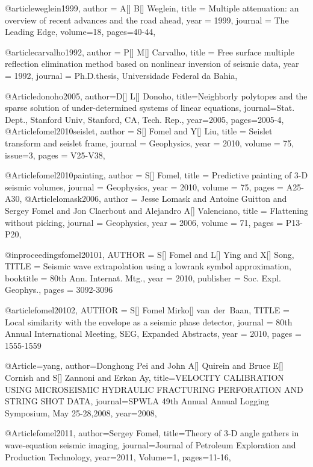 @article{weglein1999,
  author =	 {A[] B[] Weglein},
  title =	 {Multiple attenuation: an overview of recent advances and the road ahead},
  year =	 1999,
  journal =	 {The Leading Edge},
  volume=18,
 pages=40-44,
}

@article{carvalho1992,
  author =	 {P[] M[] Carvalho},
  title =	 {Free surface multiple reflection elimination method based on nonlinear inversion of seismic data},
  year =	 1992,
  journal =	 {Ph.D.thesis, Universidade Federal da Bahia},
}

@Article{donoho2005,
  author={D[] L[] Donoho},
  title={Neighborly polytopes and the sparse solution of under-determined systems of linear equations},
  journal={Stat. Dept., Stanford Univ, Stanford, CA, Tech. Rep.},
  year=2005,
  pages={2005-4},
}
@Article{fomel2010seislet,
  author = 	 {S[] Fomel and Y[] Liu},
  title = 	 {Seislet transform and seislet frame},
  journal = 	 {Geophysics},
  year = 	 2010,
  volume =	 75,
  issue=3,
  pages =	 {V25-V38},
}

@Article{fomel2010painting,
  author = 	 {S[] Fomel},
  title = 	 {Predictive painting of 3-{D} seismic volumes},
  journal = 	 {Geophysics},
  year = 	 2010,
  volume =	 75,
  pages =	 {A25-A30},
}
@Article{lomask2006,
  author = 	 {Jesse Lomask and Antoine Guitton and Sergey Fomel and Jon Claerbout and Alejandro A[] Valenciano},
  title = 	 {Flattening without picking},
  journal = 	 {Geophysics},
  year = 	 2006,
  volume =	 71,
  pages =	 {P13-P20},
}

@inproceedings{fomel20101,
  AUTHOR = {S[] Fomel and L[] Ying and X[] Song},
  TITLE = {Seismic wave extrapolation using a lowrank symbol approximation},
  booktitle =    {80th Ann. Internat. Mtg.},
  year = 	 {2010},
  publisher =    {Soc. Expl. Geophys.},
  pages = {3092-3096}
}

@article{fomel20102,
  AUTHOR = {S[] Fomel Mirko[] van~der~Baan},
  TITLE = {Local similarity with the envelope as a seismic phase detector},
  journal =    {80th Annual International Meeting, SEG, Expanded Abstracts},
  year = 	 {2010},
  pages = {1555-1559}
}

@Article={yang,
  author={Donghong Pei and John A[] Quirein and Bruce E[] Cornish and S[] Zannoni and Erkan Ay},
  title={VELOCITY CALIBRATION USING MICROSEISMIC HYDRAULIC FRACTURING PERFORATION AND STRING SHOT DATA},
  journal={SPWLA 49th Annual Annual Logging Symposium, May 25-28,2008},
  year=2008,
}


@Article{fomel2011,
  author={Sergey Fomel},
  title={Theory of 3-D angle gathers in wave-equation seismic imaging},
  journal={Journal of Petroleum Exploration and Production Technology},
  year=2011,
  Volume=1,
  pages={11-16},
}



